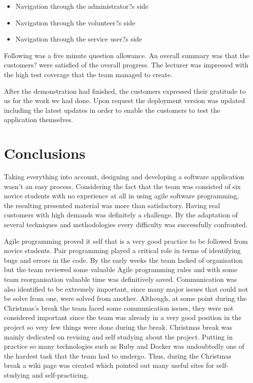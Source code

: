 \documentclass{l3proj}
\begin{document}
\begin{itemize}
	\item Navigation through the administrator?s side
	\item Navigation through the volunteer?s side
	\item Navigation through the service user?s side
\end{itemize}

Following was a five minute question allowance. An overall summary was that the customers? were satisfied of the overall progress. The lecturer was impressed with the high test coverage that the team managed to create.

After the demonstration had finished, the customers expressed their gratitude to us for the work we had done. Upon request the deployment version was updated including the latest updates in order to enable the customers to test the application themselves.




\section{Conclusions}

Taking everything into account, designing and developing a software application wasn't an easy process. Considering the fact that the team was consisted of six novice students with no experience at all in using agile software programming, the resulting presented material was more than satisfactory. Having real customers with high demands was definitely a challenge. By the adaptation of several techniques and methodologies every difficulty was successfully confronted.

Agile programming proved it self that is a very good practice to be followed from novice students. Pair programming played a critical role in terms of identifying bugs and errors in the code. By the early weeks the team lacked of organisation but the team reviewed some valuable Agile programming rules and with some team reorganisation valuable time was definitively saved. Communication was also identified to be extremely important, since many major issues that could not be solve from one, were solved from another. Although, at some point during the Christmas's break the team faced some communication issues, they were not considered important since the team was already in a very good position in the project so very few things were done during the break. Christmas break was mainly dedicated on revising and self studying about the project. Putting in practice so many technologies such as Ruby and Docker was undoubtedly one of the hardest task that the team had to undergo. Thus, during the Christmas break a wiki page was created which pointed out many useful sites for self-studying and self-practicing.
\end{document}
